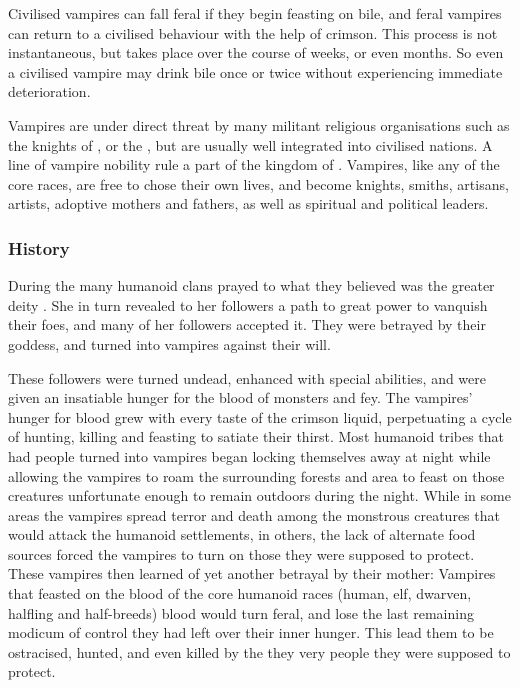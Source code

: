 Civilised vampires can fall feral if they begin feasting on bile, and feral
vampires can return to a civilised behaviour with the help of crimson. This
process is not instantaneous, but takes place over the course of weeks, or
even months. So even a civilised vampire may drink bile once or twice without
experiencing immediate deterioration.

Vampires are under direct threat by many militant religious organisations such
as the knights of , or the , but are
usually well integrated into civilised nations. A line of vampire nobility
rule a part of the kingdom of . Vampires, like any of
the core races, are free to chose their own lives, and become knights, smiths,
artisans, artists, adoptive mothers and fathers, as well as spiritual and
political leaders.

\subsubsection{History}

During the  many humanoid clans prayed to what
they believed was the greater deity . She in turn revealed
to her followers a path to great power to vanquish their foes, and many of her
followers accepted it. They were betrayed by their goddess, and turned into
vampires against their will.

These followers were turned undead, enhanced with special abilities, and were
given an insatiable hunger for the blood of monsters and fey. The vampires'
hunger for blood grew with every taste of the crimson liquid, perpetuating a
cycle of hunting, killing and feasting to satiate their thirst. Most humanoid
tribes that had people turned into vampires began locking themselves away at
night while allowing the vampires to roam the surrounding forests and area to
feast on those creatures unfortunate enough to remain outdoors during the
night. While in some areas the vampires spread terror and death among the
monstrous creatures that would attack the humanoid settlements, in others, the
lack of alternate food sources forced the vampires to turn on those they were
supposed to protect. These vampires then learned of yet another betrayal by
their mother: Vampires that feasted on the blood of the core humanoid races
(human, elf, dwarven, halfling and half-breeds) blood would turn feral, and
lose the last remaining modicum of control they had left over their inner
hunger. This lead them to be ostracised, hunted, and even killed by the they
very people they were supposed to protect.

